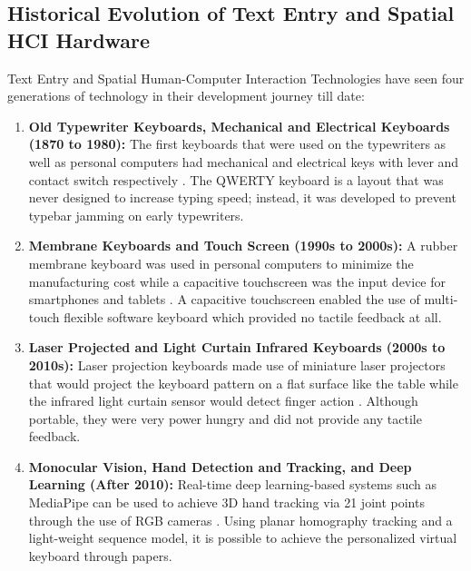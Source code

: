 \subsection{Historical Evolution of Text Entry and Spatial HCI Hardware}
\label{subsec:lit_history_evolution}
Text Entry and Spatial Human-Computer Interaction Technologies have seen four generations of technology in their development journey till date:
\begin{enumerate}
    \item \textbf{Old Typewriter Keyboards, Mechanical and Electrical Keyboards (1870 to 1980):} The first keyboards that were used on the typewriters as well as personal computers had mechanical and electrical keys with lever and contact switch respectively \cite{ReviewVirtualKeyboard2020}. The QWERTY keyboard is a layout that was never designed to increase typing speed; instead, it was developed to prevent typebar jamming on early typewriters.
    \item \textbf{Membrane Keyboards and Touch Screen (1990s to 2000s):} A rubber membrane keyboard was used in personal computers to minimize the manufacturing cost while a capacitive touchscreen was the input device for smartphones and tablets \cite{ReviewVirtualKeyboard2020}. A capacitive touchscreen enabled the use of multi-touch flexible software keyboard which provided no tactile feedback at all.
    \item \textbf{Laser Projected and Light Curtain Infrared Keyboards (2000s to 2010s):} Laser projection keyboards made use of miniature laser projectors that would project the keyboard pattern on a flat surface like the table while the infrared light curtain sensor would detect finger action \cite{Cheng2015Fingertip, Kudale2016RealTime}. Although portable, they were very power hungry and did not provide any tactile feedback.
    \item \textbf{Monocular Vision, Hand Detection and Tracking, and Deep Learning (After 2010):} Real-time deep learning-based systems such as MediaPipe can be used to achieve 3D hand tracking via 21 joint points through the use of RGB cameras \cite{Zhang2020MediaPipe, GilMartin2023Hand, Maman2023TypeNet}. Using planar homography tracking and a light-weight sequence model, it is possible to achieve the personalized virtual keyboard through papers.
\end{enumerate}

